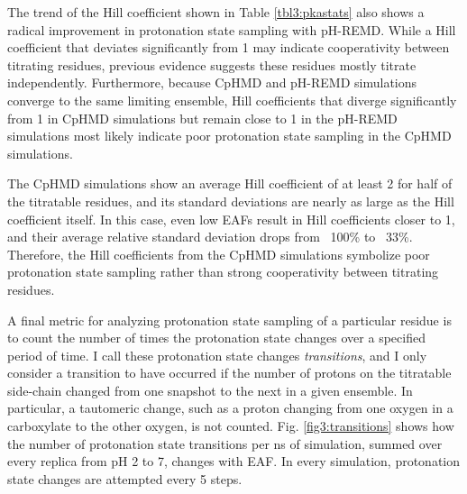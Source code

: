 The trend of the Hill coefficient shown in Table \ref{tbl3:pkastats} also shows
a radical improvement in protonation state sampling with pH-REMD.  While a Hill
coefficient that deviates significantly from 1 may indicate cooperativity
between titrating residues, previous evidence suggests these residues mostly
titrate independently.  \cite{Mongan_JComputChem_2004_v25_p2038}  Furthermore,
because CpHMD and pH-REMD simulations converge to the same limiting ensemble,
Hill coefficients that diverge significantly from 1 in CpHMD simulations but
remain close to 1 in the pH-REMD simulations most likely indicate poor
protonation state sampling in the CpHMD simulations.

The CpHMD simulations show an average Hill coefficient of at least 2 for half of
the titratable residues, and its standard deviations are nearly as large as the
Hill coefficient itself. In this case, even low EAFs result in Hill coefficients
closer to 1, and their average relative standard deviation drops from ~100\% to
~33\%.  Therefore, the Hill coefficients from the CpHMD simulations symbolize
poor protonation state sampling rather than strong cooperativity between
titrating residues.

A final metric for analyzing protonation state sampling of a particular residue
is to count the number of times the protonation state changes over a specified
period of time.  I call these protonation state changes \emph{transitions}, and
I only consider a transition to have occurred if the number of protons on the
titratable side-chain changed from one snapshot to the next in a given ensemble.
In particular, a tautomeric change, such as a proton changing from one oxygen in
a carboxylate to the other oxygen, is not counted. Fig. \ref{fig3:transitions}
shows how the number of protonation state transitions per ns of simulation,
summed over every replica from pH 2 to 7, changes with EAF.  In every
simulation, protonation state changes are attempted every 5 steps.

